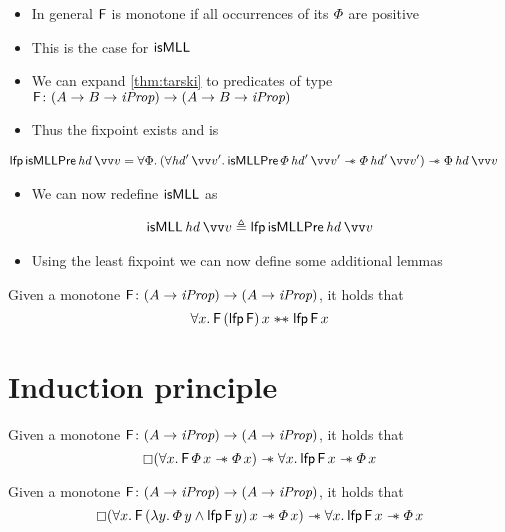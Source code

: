 \documentclass[thesis.tex]{subfiles}
\begin{document}
\begin{itemize}
    \item In general $\textsf{\upshape F}$ is monotone if all occurrences of its $\varPhi$ are positive
    \item This is the case for $\textsf{\upshape isMLL}$
    \item We can expand \cref*{thm:tarski} to predicates of type $\textsf{\upshape F}\colon (A \to B \to \textit{iProp}) \to (A \to B \to \textit{iProp})$
    \item Thus the fixpoint exists and is
\end{itemize}
\begin{align*}
    \lfp\, \textlog{isMLLPre}\, \langv{hd}\, \vect{v} & = \All \Phi. (\All \langv{hd}'\, \vect{v}'. \textlog{isMLLPre}\, \pred\, \langv{hd}'\, \vect{v}' \wand \pred\, \langv{hd}'\, \vect{v}') \wand \Phi \, \langv{hd}\, \vect{v}
\end{align*}
\begin{itemize}
    \item We can now redefine $\textsf{\upshape isMLL}$ as
\end{itemize}
\begin{align*}
    \textlog{isMLL}\, \langv{hd}\, \vect{v} \eqdef \lfp\, \textlog{isMLLPre}\, \langv{hd}\, \vect{v}
\end{align*}
\begin{itemize}
    \item Using the least fixpoint we can now define some additional lemmas
\end{itemize}
\begin{lemma}
    Given a monotone $\textsf{\upshape F}\colon (A \to \textit{iProp}) \to (A \to \textit{iProp})$, it holds that
    \[\All\var.\hopred\,(\lfp\,\hopred)\,\var \wandIff \lfp\,\hopred\,\var\]
\end{lemma}
\section{Induction principle}


\begin{lemma}
    Given a monotone $\textsf{\upshape F}\colon (A \to \textit{iProp}) \to (A \to \textit{iProp})$, it holds that
    \[\always(\All\var.\hopred\,\pred\,\var \wand \pred\,\var) \wand \All\var. \lfp\,\hopred\,\var \wand \pred\,\var\]
\end{lemma}
\begin{lemma}
    Given a monotone $\textsf{\upshape F}\colon (A \to \textit{iProp}) \to (A \to \textit{iProp})$, it holds that
    \[\always(\All\var.\hopred\,(\Lam\varB. \pred\,\varB \land \lfp\,\hopred\,\varB)\,\var \wand \pred\,\var) \wand \All\var. \lfp\,\hopred\,\var \wand \pred\,\var\]
\end{lemma}
\end{document}
